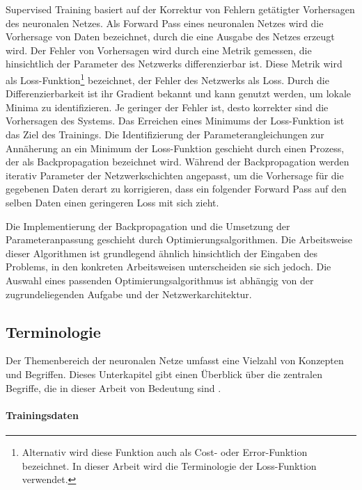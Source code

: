 Supervised Training basiert auf der Korrektur von Fehlern getätigter Vorhersagen des neuronalen Netzes. Als Forward Pass eines neuronalen Netzes wird die Vorhersage von Daten bezeichnet, durch die eine Ausgabe des Netzes erzeugt wird. Der Fehler von Vorhersagen wird durch eine Metrik gemessen, die hinsichtlich der Parameter des Netzwerks differenzierbar ist. Diese Metrik wird als Loss-Funktion\footnote{Alternativ wird diese Funktion auch als Cost- oder Error-Funktion bezeichnet. In dieser Arbeit wird die Terminologie der Loss-Funktion verwendet.} bezeichnet, der Fehler des Netzwerks als Loss. Durch die Differenzierbarkeit ist ihr Gradient bekannt und kann genutzt werden, um lokale Minima zu identifizieren. Je geringer der Fehler ist, desto korrekter sind die Vorhersagen des Systems. Das Erreichen eines Minimums der Loss-Funktion ist das Ziel des Trainings. Die Identifizierung der Parameterangleichungen zur Annäherung an ein Minimum der Loss-Funktion geschieht durch einen Prozess, der als Backpropagation bezeichnet wird. Während der Backpropagation werden iterativ Parameter der Netzwerkschichten angepasst, um die Vorhersage für die gegebenen Daten derart zu korrigieren, dass ein folgender Forward Pass auf den selben Daten einen geringeren Loss mit sich zieht.

Die Implementierung der Backpropagation und die Umsetzung der Parameteranpassung geschieht durch Optimierungsalgorithmen. Die Arbeitsweise dieser Algorithmen ist grundlegend ähnlich hinsichtlich der Eingaben des Problems, in den konkreten Arbeitsweisen unterscheiden sie sich jedoch. Die Auswahl eines passenden Optimierungsalgorithmus ist abhängig von der zugrundeliegenden Aufgabe und der Netzwerkarchitektur.



\subsection{Terminologie}
\label{sec:nn_terminologie}

Der Themenbereich der neuronalen Netze umfasst eine Vielzahl von Konzepten und Begriffen. Dieses Unterkapitel gibt einen Überblick über die zentralen Begriffe, die in dieser Arbeit von Bedeutung sind \cite{nn_terminology}.

\paragraph{Trainingsdaten}


